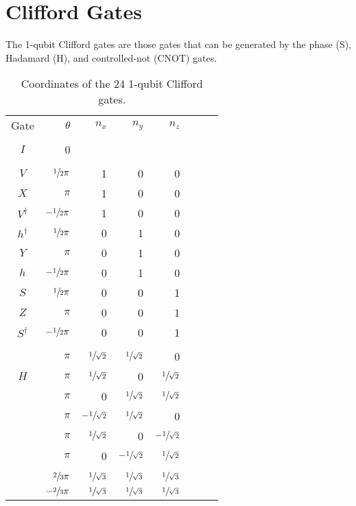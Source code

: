 \documentclass[article,pagebackref]{bespoke5}
\begin{document}
 \section{Clifford Gates}

The 1-qubit Clifford gates are those gates that can be generated by the phase (S), Hadamard (H), and controlled-not (CNOT) gates.




\begin{table}[htp]
\caption{Coordinates of the 24 1-qubit Clifford gates.}
\begin{center}
\begin{tabular}{crrrrcc}
Gate & $\theta$ & $n_x$ & $n_y$ & $n_z$  \\
\\
$I$ & 0 &&&												& $\quad$ & \\
\\
$V$ 					& $\sfrac{1}{2}\pi$ 	& 1 & 0 & 0  & %
\\
$X$ 					& $\pi$ 				& 1 & 0 & 0 & %
\\
$ V^\dagger$   			& $-\sfrac{1}{2}\pi$ 	& 1 & 0 & 0 &%
\\
$h^\dagger$            	& $\sfrac{1}{2}\pi$ 	& 0 & 1 & 0 &%
\\
$Y$ 			      	& $\pi$ 		 		& 0 & 1 & 0 &%
\\
$h$    					& $-\sfrac{1}{2}\pi$  	& 0 & 1 & 0 &%
\\
$S$ 					& $\sfrac{1}{2}\pi$  	& 0 & 0 & 1 &%
\\
$Z$ 					& $\pi$ 				& 0 & 0 & 1 &%
\\
$S^\dagger$ 			& $-\sfrac{1}{2}\pi$ 	& 0 & 0 & 1 &%
\\
\\
						& $\pi$ 				& $\sfrac{1}{\sqrt{2}}$ & $\sfrac{1}{\sqrt{2}}$ & 0 	&%
\\
$H$						& $\pi$ 				& $\sfrac{1}{\sqrt{2}}$ &0 & $\sfrac{1}{\sqrt{2}}$ 		&%
\\
						& $\pi$ 				& 0 & $\sfrac{1}{\sqrt{2}}$ & $\sfrac{1}{\sqrt{2}}$ 	&%
\\
						& $\pi$ 				& $-\sfrac{1}{\sqrt{2}}$ & $\sfrac{1}{\sqrt{2}}$ & 0 	&%
\\
						& $\pi$ 				& $\sfrac{1}{\sqrt{2}}$ &0 & $-\sfrac{1}{\sqrt{2}}$ 	&%
\\
						& $\pi$ 				& 0 & $-\sfrac{1}{\sqrt{2}}$ & $\sfrac{1}{\sqrt{2}}$ 	&%
\\
\\
						& $\sfrac{2}{3}\pi$ 	& $\sfrac{1}{\sqrt{3}}$ & $\sfrac{1}{\sqrt{3}}$ & $\sfrac{1}{\sqrt{3}}$ & \\
						& $-\sfrac{2}{3}\pi$	& $\sfrac{1}{\sqrt{3}}$ & $\sfrac{1}{\sqrt{3}}$ & $\sfrac{1}{\sqrt{3}}$ & \\


\end{tabular}
\end{center}
\end{table}
\end{document}
